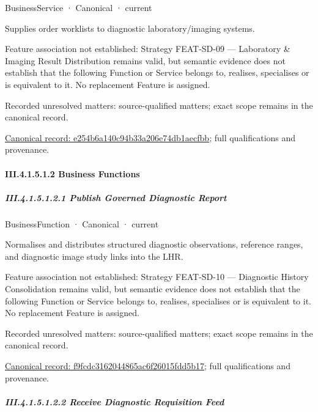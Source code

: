 \label{element:e254b6a140c94b33a206e74db1aecfbb}
{\small BusinessService · Canonical · current}\par

Supplies order worklists to diagnostic laboratory/imaging systems.



Feature association not established: Strategy FEAT-SD-09 — Laboratory \& Imaging Result Distribution remains valid, but semantic evidence does not establish that the following Function or Service belongs to, realises, specialises or is equivalent to it. No replacement Feature is assigned.


{\small Recorded unresolved matters: source-qualified matters; exact scope remains in the canonical record.}\par
{\footnotesize \href{../../../../../../../continuum/business/business-service/e254b6a140c94b33a206e74db1aecfbb.md}{Canonical record: e254b6a140c94b33a206e74db1aecfbb}; full qualifications and provenance.}\par
\paragraph*{III.4.1.5.1.2 Business Functions}
\label{navigation:III.4.1.5.1.2}

\subparagraph*{III.4.1.5.1.2.1 Publish Governed Diagnostic Report}
\label{navigation:III.4.1.5.1.2.1}

\label{element:f9fcdc3162044865ac6f26015fdd5b17}
{\small BusinessFunction · Canonical · current}\par

Normalises and distributes structured diagnostic observations, reference ranges, and diagnostic image study links into the LHR.



Feature association not established: Strategy FEAT-SD-10 — Diagnostic History Consolidation remains valid, but semantic evidence does not establish that the following Function or Service belongs to, realises, specialises or is equivalent to it. No replacement Feature is assigned.


{\small Recorded unresolved matters: source-qualified matters; exact scope remains in the canonical record.}\par
{\footnotesize \href{../../../../../../../continuum/business/business-function/f9fcdc3162044865ac6f26015fdd5b17.md}{Canonical record: f9fcdc3162044865ac6f26015fdd5b17}; full qualifications and provenance.}\par
\subparagraph*{III.4.1.5.1.2.2 Receive Diagnostic Requisition Feed}
\label{navigation:III.4.1.5.1.2.2}

